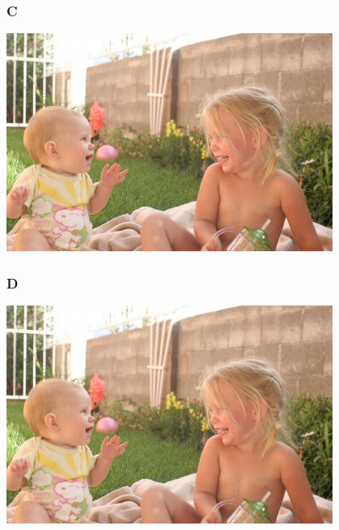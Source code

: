\documentclass[mathserif,xcolor=dvipsnames,hyperref={bookmarks=true}]{beamer}
\begin{document}
\begin{frame}[t]
    \frametitle{C}
    \begin{center}
        \includegraphics[width=0.8\textwidth]{../images/c.jpg}
    \end{center}
\end{frame}
\begin{frame}[t]
    \frametitle{D}
    \begin{center}
        \includegraphics[width=0.8\textwidth]{../images/d.jpg}
    \end{center}
\end{frame}
\end{document}
